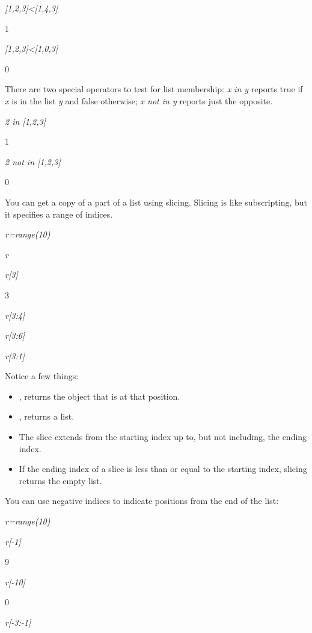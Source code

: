 \emph{{[}1,2,3{]}\textless{}{[}1,4,3{]}}

1


\emph{{[}1,2,3{]}\textless{}{[}1,0,3{]}}

0

There are two special operators to
test for list membership: \emph{x in y} reports true if \emph{x} is in
the list \emph{y} and false otherwise; \emph{x not in y} reports just
the opposite.


\emph{2 in {[}1,2,3{]}}

1


\emph{2 not in {[}1,2,3{]}}

0

You can get a copy of a part of a
list using slicing. Slicing is like subscripting, but it specifies a
range of indices.


\emph{r=range(10)}


\emph{r}




\emph{r{[}3{]}}

3


\emph{r{[}3:4{]}}




\emph{r{[}3:6{]}}




\emph{r{[}3:1{]}}



Notice a few things:

\begin{itemize}
\tightlist
\item
   ,
  returns the object that is at that position.
\item
  ,
  returns a list.
\item
  The slice extends from the
  starting index up to, but not including, the ending index.
\item
  If the ending index of a slice is
  less than or equal to the starting index, slicing returns the empty
  list.
\end{itemize}

You can use negative indices to
indicate positions from the end of the list:


\emph{r=range(10)}


\emph{r{[}-1{]}}

9


\emph{r{[}-10{]}}

0


\emph{r{[}-3:-1{]}}




